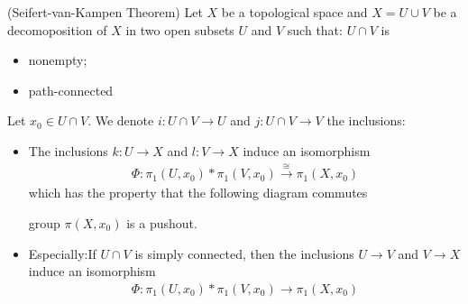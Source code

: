 \documentclass[Total.tex]{subfiles}
\begin{document}
	\begin{theorem}
		(Seifert-van-Kampen Theorem) Let $X$ be a topological space and $X=U\cup V$ be a decomoposition of $X$ in two open subsets $U$ and $V$ such that: $U\cap V$ is 
		\begin{itemize}
			\item nonempty;
			\item path-connected
		\end{itemize}
		Let $x_0\in U\cap V$. We denote $i:U\cap V\rightarrow U$ and $j:U\cap V\rightarrow V$ the inclusions:
		\begin{itemize}
			\item The inclusions $k:U\rightarrow X$ and $l:V\rightarrow X$ induce an isomorphism
			\begin{gather*}
				\Phi:\pi_1(U,x_0)*\pi_1(V,x_0)\stackrel{\cong}{\rightarrow} \pi_1(X,x_0)
			\end{gather*}
			which has the property that the following diagram commutes
			\begin{center}
			\end{center}
			group $\pi(X,x_0)$ is a pushout.
			\item Especially:If $U\cap V$ is simply connected, then the inclusions $U\rightarrow V$ and $V\rightarrow X$ induce an isomorphism
			\begin{gather*}
				\Phi:\pi_1(U,x_0)*\pi_1(V,x_0)\rightarrow \pi_1(X,x_0)
			\end{gather*}
		\end{itemize}
	\end{theorem}
\end{document}
